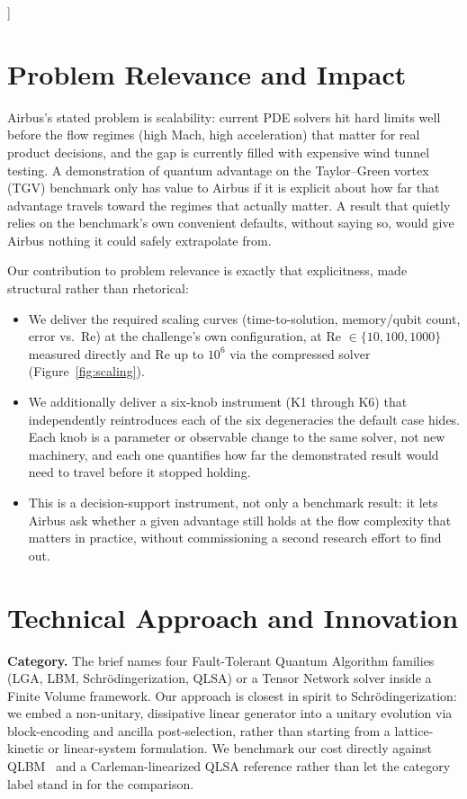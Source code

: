 \documentclass[10.5pt,twocolumn]{article}
\begin{document}
]
\makeatother

\section{Problem Relevance and Impact}

Airbus's stated problem is scalability: current PDE solvers hit hard limits well before the flow regimes (high Mach, high acceleration) that matter for real product decisions, and the gap is currently filled with expensive wind tunnel testing. A demonstration of quantum advantage on the Taylor--Green vortex (TGV) benchmark only has value to Airbus if it is explicit about how far that advantage travels toward the regimes that actually matter. A result that quietly relies on the benchmark's own convenient defaults, without saying so, would give Airbus nothing it could safely extrapolate from.

Our contribution to problem relevance is exactly that explicitness, made structural rather than rhetorical:

\begin{itemize}[leftmargin=1.4em, itemsep=0.2em]
\item We deliver the required scaling curves (time-to-solution, memory/qubit count, error vs.\ Re) at the challenge's own configuration, at Re $\in \{10, 100, 1000\}$ measured directly and Re up to $10^6$ via the compressed solver (Figure~\ref{fig:scaling}).
\item We additionally deliver a six-knob instrument (K1 through K6) that independently reintroduces each of the six degeneracies the default case hides. Each knob is a parameter or observable change to the same solver, not new machinery, and each one quantifies how far the demonstrated result would need to travel before it stopped holding.
\item This is a decision-support instrument, not only a benchmark result: it lets Airbus ask whether a given advantage still holds at the flow complexity that matters in practice, without commissioning a second research effort to find out.
\end{itemize}

\section{Technical Approach and Innovation}

\textbf{Category.} The brief names four Fault-Tolerant Quantum Algorithm families (LGA, LBM, Schr\"odingerization, QLSA) or a Tensor Network solver inside a Finite Volume framework. Our approach is closest in spirit to Schr\"odingerization: we embed a non-unitary, dissipative linear generator into a unitary evolution via block-encoding and ancilla post-selection, rather than starting from a lattice-kinetic or linear-system formulation. We benchmark our cost directly against QLBM~\cite{jennings2025} and a Carleman-linearized QLSA reference rather than let the category label stand in for the comparison.
\end{document}
